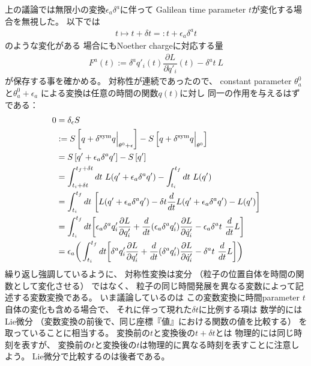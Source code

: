 上の議論では無限小の変換$\epsilon_a \delta^a$に伴って
Galilean time parameter $t$が変化する場合を無視した。
以下では
\begin{align}
  t
  \mapsto t + \delta t
  =: t + \epsilon_a \delta^a t
\end{align}
のような変化がある
場合にもNoether chargeに対応する量
\begin{align}
  F^a(t):=
    \delta^a q'_i (t)
  \dfrac{\partial L}{\partial \dot{q}'_i} (t)
-
  \delta^a t
  \ 
  L
\end{align}
が保存する事を確かめる。
対称性が連続であったので、
constant parameter $\theta_a^0$と$\theta_a^0 + \epsilon_a$
による変換は任意の時間の関数$q(t)$に対し
同一の作用を与えるはずである：
\begin{align}
  0 &=
  \delta_{\epsilon} S
\notag\\&:=
  S\left[ q + \delta^{\mathrm{sym}} q\Big|_{\theta^0 + \epsilon} \right]
  -
  S\left[ q + \delta^{\mathrm{sym}} q\Big|_{\theta^0} \right]
\notag\\&=
  S\left[ q' + \epsilon_a \delta^a q' \right]
  -
  S\left[ q' \right]
\notag\\&=
  \int_{t_i + \delta t}^{t_f + \delta t} dt\ 
    L( q' + \epsilon_a \delta^a q' )
  -
  \int_{t_i}^{t_f} dt\ 
    L( q' )
\notag\\&=
  \int_{t_i}^{t_f} dt\ 
  \bigg[
    L( q' + \epsilon_a \delta^a q' )
    - \delta t
    \dfrac{d}{dt}
    L( q' + \epsilon_a \delta^a q' )
  -
    L( q' )
  \bigg]
\notag\\&=
  \int_{t_i}^{t_f} dt
  \bigg[
    \epsilon_a
    \delta^a q'_i
    \dfrac{\partial L}{\partial q'_i}
  +
  \dfrac{d}{dt}
    (\epsilon_a
    \delta^a q'_i)
    \dfrac{\partial L}{\partial \dot{q}'_i}
  -
    \epsilon_a 
    \delta^a t
    \ 
    \dfrac{d}{dt}
    L
  \bigg]
\notag\\&=
    \epsilon_a
  \bigg(
  \int_{t_i}^{t_f} dt
  \bigg[
    \delta^a q'_i
    \dfrac{\partial L}{\partial q'_i}
  +
    \dfrac{d}{dt}
    (\delta^a q'_i)
    \dfrac{\partial L}{\partial \dot{q}'_i}
  -
    \delta^a t
    \ 
    \dfrac{d}{dt}
    L
  \bigg]
  \bigg)
\label{action difference under symmetry transformation}
\end{align}
繰り返し強調しているように、
対称性変換は変分
（粒子の位置自体を時間の関数として変化させる）
ではなく、
粒子の同じ時間発展を異なる変数によって記述する変数変換である。
いま議論しているのは
この変数変換に時間parameter $t$自体の変化も含める場合で、
それに伴って現れた$\delta t$に比例する項は
数学的にはLie微分
（変数変換の前後で、同じ座標『値』における関数の値を比較する）
を取っていることに相当する。
変換前の$t$と変換後の$t + \delta t$とは
物理的には同じ時刻を表すが、
変換前の$t$と変換後の$t$は物理的に異なる時刻を表すことに注意しよう。
Lie微分で比較するのは後者である。


